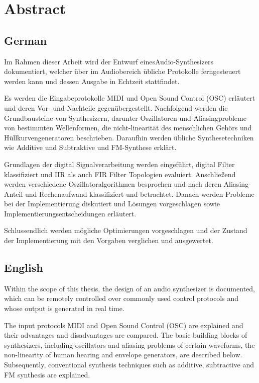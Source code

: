 \chapter*{Abstract}\label{abstract}

\section*{German}

Im Rahmen dieser Arbeit wird der Entwurf einesAudio-Synthesizers dokumentiert, welcher über im Audiobereich übliche Protokolle ferngesteuert werden kann und dessen Ausgabe in Echtzeit stattfindet.

Es werden die Eingabeprotokolle MIDI und Open Sound Control (OSC) erläutert und deren Vor- und Nachteile gegenübergestellt.
Nachfolgend werden die Grundbausteine von Synthesizern, darunter Oszillatoren und Aliasingprobleme von bestimmten Wellenformen, die nicht-linearität des menschlichen Gehörs und Hüllkurvengeneratoren beschrieben.
Daraufhin werden übliche Synthesetechniken wie Additive und Subtraktive und FM-Synthese erklärt.

Grundlagen der digital Signalverarbeitung werden eingeführt, digital Filter klassifiziert und IIR als auch FIR Filter Topologien evaluiert.
Anschließend werden verschiedene Oszillatoralgorithmen besprochen und nach deren Aliasing-Anteil und Rechenaufwand klassifiziert und betrachtet.
Danach werden Probleme bei der Implementierung diskutiert und Lösungen vorgeschlagen sowie Implementierungsentscheidungen erläutert.

Schlussendlich werden mögliche Optimierungen vorgeschlagen und der Zustand der Implementierung mit den Vorgaben verglichen und ausgewertet.

\section*{English}

Within the scope of this thesis, the design of an audio synthesizer is documented, which can be remotely controlled over commonly used control protocols and whose output is generated in real time.

The input protocols MIDI and Open Sound Control (OSC) are explained and their advantages and disadvantages are compared.
The basic building blocks of synthesizers, including oscillators and aliasing problems of certain waveforms, the non-linearity of human hearing and envelope generators, are described below.
Subsequently, conventional synthesis techniques such as additive, subtractive and FM synthesis are explained.

